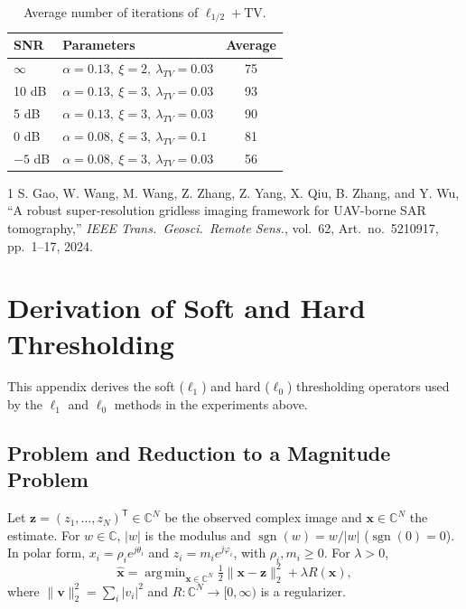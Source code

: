 \documentclass[11pt,a4paper]{article}
\theoremstyle{definition}
\newcommand{\C}{\mathbb{C}}
\DeclareMathOperator*{\argmin}{arg\,min}
\DeclareMathOperator{\sgn}{sgn}
\begin{document}
\begin{table}[H]
\centering
\caption{Average number of iterations of $\ell_{1/2}+\mathrm{TV}$.}\label{tab:iter}
\begin{tabular}{|l|l|c|}
\hline
SNR & Parameters & Average \\
\hline
$\infty$ & $\alpha = 0.13,\ \xi = 2,\ \lambda_{TV} = 0.03$ & 75 \\
\hline
10 dB & $\alpha = 0.13,\ \xi = 3,\ \lambda_{TV} = 0.03$ & 93 \\
\hline
5 dB & $\alpha = 0.13,\ \xi = 3,\ \lambda_{TV} = 0.03$ & 90 \\
\hline
0 dB & $\alpha = 0.08,\ \xi = 3,\ \lambda_{TV} = 0.1$ & 81 \\
\hline
$-5$ dB & $\alpha = 0.08,\ \xi = 3,\ \lambda_{TV} = 0.03$ & 56 \\
\hline
\end{tabular}
\end{table}

\begin{thebibliography}{1}
S. Gao, W. Wang, M. Wang, Z. Zhang, Z. Yang, X. Qiu, B. Zhang, and Y. Wu,
``A robust super-resolution gridless imaging framework for UAV-borne SAR tomography,''
\emph{IEEE Trans.\ Geosci.\ Remote Sens.}, vol.~62, Art.~no.~5210917, pp.~1--17, 2024.
\end{thebibliography}

\clearpage
\appendix
\setcounter{equation}{0}
\renewcommand{\theequation}{\thesection.\arabic{equation}}

\section{Derivation of Soft and Hard Thresholding}\label{app:thresholding}

This appendix derives the soft ($\ell_1$) and hard ($\ell_0$) thresholding operators used by the
$\ell_1$ and $\ell_0$ methods in the experiments above.

\subsection{Problem and Reduction to a Magnitude Problem}

Let $\mathbf z = (z_1,\dots,z_N)^{\mathsf T}\in\C^N$ be the observed complex image and
$\mathbf x\in\C^N$ the estimate. For $w\in\C$, $|w|$ is the modulus and
$\sgn(w) = w/|w|$ ($\sgn(0)=0$). In polar form,
$x_i = \rho_i e^{j\theta_i}$ and $z_i = m_i e^{j\varphi_i}$, with $\rho_i,m_i\ge0$.
For $\lambda>0$,
\begin{equation}\label{eq:problem}
  \hat{\mathbf x} = \argmin_{\mathbf x\in\C^N}
  \tfrac12\lVert \mathbf x - \mathbf z\rVert_2^2 + \lambda R(\mathbf x),
\end{equation}
where $\lVert\mathbf v\rVert_2^2 = \sum_i |v_i|^2$ and $R:\C^N\to[0,\infty)$ is a regularizer.
\end{document}
